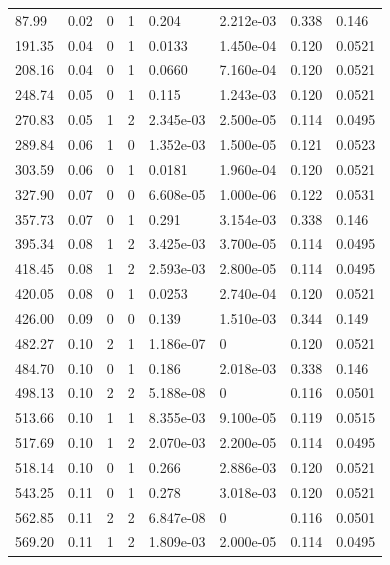 \documentclass[preview]{standalone}
\begin{document}
{{\begin{tabular}{L{1.2cm}C{1.2cm} C{0.3cm}C{0.5cm} C{1.4cm}C{1.4cm} C{1.4cm}C{1.4cm}}
  87.99  &  0.02  & 0     &  1 &  0.204  & 2.212e-03  & 0.338 &  0.146   \\ 
  191.35  &  0.04  & 0     &  1 &  0.0133  & 1.450e-04  & 0.120 &  0.0521   \\ 
  208.16  &  0.04  & 0     &  1 &  0.0660  & 7.160e-04  & 0.120 &  0.0521   \\ 
  248.74  &  0.05  & 0     &  1 &  0.115  & 1.243e-03  & 0.120 &  0.0521   \\ 
  270.83  &  0.05  & 1     &  2 &  2.345e-03  & 2.500e-05  & 0.114 &  0.0495   \\ 
  289.84  &  0.06  & 1     &  0 &  1.352e-03  & 1.500e-05  & 0.121 &  0.0523   \\ 
  303.59  &  0.06  & 0     &  1 &  0.0181  & 1.960e-04  & 0.120 &  0.0521   \\ 
  327.90  &  0.07  & 0     &  0 &  6.608e-05  & 1.000e-06  & 0.122 &  0.0531   \\ 
  357.73  &  0.07  & 0     &  1 &  0.291  & 3.154e-03  & 0.338 &  0.146   \\ 
  395.34  &  0.08  & 1     &  2 &  3.425e-03  & 3.700e-05  & 0.114 &  0.0495   \\ 
  418.45  &  0.08  & 1     &  2 &  2.593e-03  & 2.800e-05  & 0.114 &  0.0495   \\ 
  420.05  &  0.08  & 0     &  1 &  0.0253  & 2.740e-04  & 0.120 &  0.0521   \\ 
  426.00  &  0.09  & 0     &  0 &  0.139  & 1.510e-03  & 0.344 &  0.149   \\ 
  482.27  &  0.10  & 2     &  1 &  1.186e-07  & 0  & 0.120 &  0.0521   \\ 
  484.70  &  0.10  & 0     &  1 &  0.186  & 2.018e-03  & 0.338 &  0.146   \\ 
  498.13  &  0.10  & 2     &  2 &  5.188e-08  & 0  & 0.116 &  0.0501   \\ 
  513.66  &  0.10  & 1     &  1 &  8.355e-03  & 9.100e-05  & 0.119 &  0.0515   \\ 
  517.69  &  0.10  & 1     &  2 &  2.070e-03  & 2.200e-05  & 0.114 &  0.0495   \\ 
  518.14  &  0.10  & 0     &  1 &  0.266  & 2.886e-03  & 0.120 &  0.0521   \\ 
  543.25  &  0.11  & 0     &  1 &  0.278  & 3.018e-03  & 0.120 &  0.0521   \\ 
  562.85  &  0.11  & 2     &  2 &  6.847e-08  & 0  & 0.116 &  0.0501   \\ 
  569.20  &  0.11  & 1     &  2 &  1.809e-03  & 2.000e-05  & 0.114 &  0.0495   \\ 

\end{tabular}}}
\end{document}
